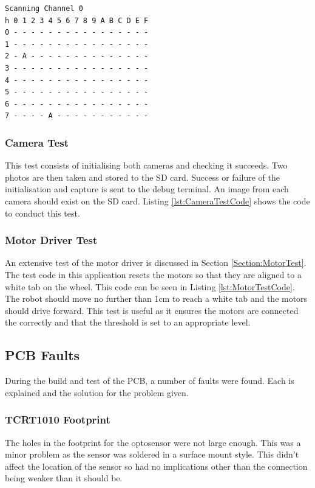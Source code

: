 \begin{lstlisting}[caption={Result of \itc bus scan with Channel 0 of the \itc multiplexer selected},label={lst:I2CTest}]
Scanning Channel 0
h 0 1 2 3 4 5 6 7 8 9 A B C D E F
0 - - - - - - - - - - - - - - - -
1 - - - - - - - - - - - - - - - -
2 - A - - - - - - - - - - - - - -
3 - - - - - - - - - - - - - - - -
4 - - - - - - - - - - - - - - - -
5 - - - - - - - - - - - - - - - -
6 - - - - - - - - - - - - - - - -
7 - - - - A - - - - - - - - - - -
\end{lstlisting}

\subsubsection{Camera Test}\label{Camera:Test}

This test consists of initialising both cameras and checking it succeeds. Two photos are then taken and stored to the SD card. Success or failure of the initialisation and capture is sent to the debug terminal. An image from each camera should exist on the SD card. Listing \ref{lst:CameraTestCode} shows the code to conduct this test.

\subsubsection{Motor Driver Test}\label{Motor:Test}
An extensive test of the motor driver is discussed in Section \ref{Section:MotorTest}. The test code in this application resets the motors so that they are aligned to a white tab on the wheel. This code can be seen in Listing \ref{lst:MotorTestCode}. The robot should move no further than 1cm to reach a white tab and the motors should drive forward. This test is useful as it ensures the motors are connected the correctly and that the threshold is set to an appropriate level.

\subsection{PCB Faults}
During the build and test of the PCB, a number of faults were found. Each is explained and the solution for the problem given. 
\subsubsection{TCRT1010 Footprint}
The holes in the footprint for the optosensor were not large enough. This was a minor problem as the sensor was soldered in a surface mount style. This didn't affect the location of the sensor so had no implications other than the connection being weaker than it should be. 


